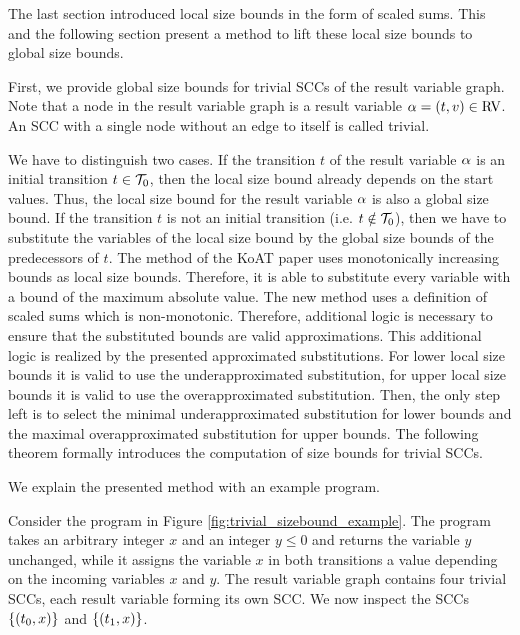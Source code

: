 The last section introduced local size bounds in the form of scaled sums.
This and the following section present a method to lift these local size bounds to global size bounds.

First, we provide global size bounds for trivial SCCs of the result variable graph.
Note that a node in the result variable graph is a result variable $\alpha = (t,v) \in \text{RV}$.
An SCC with a single node without an edge to itself is called trivial.

We have to distinguish two cases.
If the transition $t$ of the result variable $\alpha$ is an initial transition $t \in \mathcal{T}_0$, then the local size bound already depends on the start values.
Thus, the local size bound for the result variable $\alpha$ is also a global size bound.
If the transition $t$ is not an initial transition (i.e. $t \notin \mathcal{T}_0$), then we have to substitute the variables of the local size bound by the global size bounds of the predecessors of $t$.
The method of the KoAT paper \cite{koat} uses monotonically increasing bounds as local size bounds.
Therefore, it is able to substitute every variable with a bound of the maximum absolute value.
The new method uses a definition of scaled sums which is non-monotonic.
Therefore, additional logic is necessary to ensure that the substituted bounds are valid approximations.
This additional logic is realized by the presented approximated substitutions.
For lower local size bounds it is valid to use the underapproximated substitution, for upper local size bounds it is valid to use the overapproximated substitution.
Then, the only step left is to select the minimal underapproximated substitution for lower bounds and the maximal overapproximated substitution for upper bounds.
The following theorem formally introduces the computation of size bounds for trivial SCCs.



We explain the presented method with an example program.



Consider the program in Figure \ref{fig:trivial_sizebound_example}.
The program takes an arbitrary integer $x$ and an integer $y \leq 0$ and returns the variable $y$ unchanged, while it assigns the variable $x$ in both transitions a value depending on the incoming variables $x$ and $y$.
The result variable graph contains four trivial SCCs, each result variable forming its own SCC.
We now inspect the SCCs $\lbrace (t_0,x) \rbrace$ and $\lbrace (t_1,x) \rbrace$.
  

